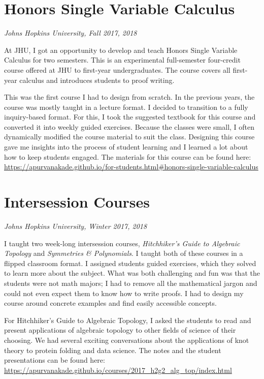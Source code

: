 \documentclass[
]{report}
\begin{document}
\hypertarget{honors-single-variable-calculus}{%
\section{Honors Single Variable Calculus}\label{honors-single-variable-calculus}}

\emph{Johns Hopkins University, Fall 2017, 2018}

At JHU, I got an opportunity to develop and teach Honors Single Variable Calculus for two semesters. This is an experimental full-semester four-credit course offered at JHU to first-year undergraduates. The course covers all first-year calculus and introduces students to proof writing.

This was the first course I had to design from scratch.
In the previous years, the course was mostly taught in a lecture format.
I decided to transition to a fully inquiry-based format.
For this, I took the suggested textbook for this course and converted it into weekly guided exercises.
Because the classes were small, I often dynamically modified the course material to suit the class.
Designing this course gave me insights into the process of student learning and I learned a lot about how to keep students engaged.
The materials for this course can be found here: \url{https://apurvanakade.github.io/for-students.html\#honors-single-variable-calculus}

\hypertarget{intersession-courses}{%
\section{Intersession Courses}\label{intersession-courses}}

\emph{Johns Hopkins University, Winter 2017, 2018}

I taught two week-long intersession courses, \emph{Hitchhiker's Guide to Algebraic Topology} and \emph{Symmetries \& Polynomials}. I taught both of these courses in a flipped classroom format. I assigned students guided exercises, which they solved to learn more about the subject. What was both challenging and fun was that the students were not math majors; I had to remove all the mathematical jargon and could not even expect them to know how to write proofs. I had to design my course around concrete examples and find easily accessible concepts.

For Hitchhiker's Guide to Algebraic Topology, I asked the students to read and present applications of algebraic topology to other fields of science of their choosing. We had several exciting conversations about the applications of knot theory to protein folding and data science. The notes and the student presentations can be found here: \url{https://apurvanakade.github.io/courses/2017_h2g2_alg_top/index.html}
\end{document}
